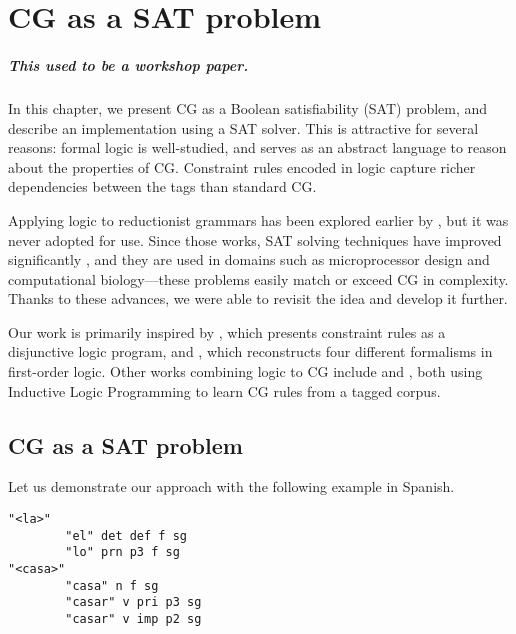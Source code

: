 \chapter{CG as a SAT problem}

\paragraph{This used to be a workshop paper.}

In this chapter, we present CG %
as a Boolean satisfiability (SAT) problem, and describe an implementation
using a SAT solver. This is attractive for several reasons: formal logic is
well-studied, and serves as an abstract language to reason about the
properties of CG. Constraint rules encoded in logic capture richer
dependencies between the tags than standard CG.

Applying logic to reductionist grammars has been explored earlier by \cite{lager98,lager_nivre01}, but it was never adopted for use.
Since those works, SAT solving techniques have improved significantly \cite{marques_silva2010}, and they are used in domains such as microprocessor design and computational 
biology---these problems easily match or exceed CG in complexity. 
Thanks to these advances, we were able to revisit the idea and develop it
further. 

Our work is primarily inspired by \cite{lager98}, which presents constraint
rules as a disjunctive logic program, and \cite{lager_nivre01}, which
reconstructs four different formalisms in first-order logic.
Other works combining logic to CG include
\cite{lindberg_eineborg98ilp} and \cite{asfrent14}, both using Inductive Logic Programming to learn CG rules from a tagged corpus.


\section{CG as a SAT problem}
Let us demonstrate our approach with the following example in Spanish.

\begin{verbatim}
"<la>"
        "el" det def f sg
        "lo" prn p3 f sg
"<casa>"
        "casa" n f sg
        "casar" v pri p3 sg
        "casar" v imp p2 sg
\end{verbatim}

